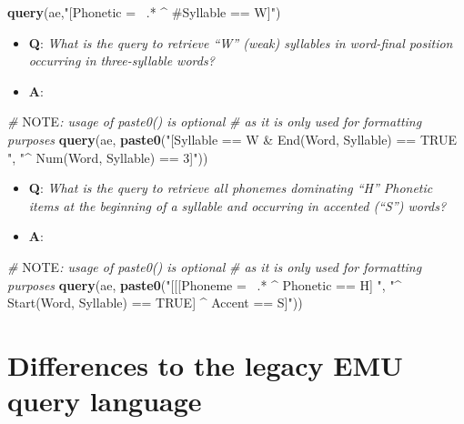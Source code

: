 \documentclass[]{book}
\newenvironment{Shaded}{\begin{snugshade}}{\end{snugshade}}
\newcommand{\AlertTok}[1]{\textcolor[rgb]{0.94,0.16,0.16}{#1}}
\newcommand{\CommentTok}[1]{\textcolor[rgb]{0.56,0.35,0.01}{\textit{#1}}}
\newcommand{\KeywordTok}[1]{\textcolor[rgb]{0.13,0.29,0.53}{\textbf{#1}}}
\newcommand{\NormalTok}[1]{#1}
\newcommand{\StringTok}[1]{\textcolor[rgb]{0.31,0.60,0.02}{#1}}
\providecommand{\tightlist}{%
  \setlength{\itemsep}{0pt}\setlength{\parskip}{0pt}}
\begin{document}
\begin{Shaded}
\begin{Highlighting}[]
\KeywordTok{query}\NormalTok{(ae,}\StringTok{"[Phonetic =~ .* ^ #Syllable == W]"}\NormalTok{)}
\end{Highlighting}
\end{Shaded}

\begin{itemize}
\tightlist
\item
  \textbf{Q}: \emph{What is the query to retrieve ``W'' (weak) syllables in word-final position occurring in three-syllable words?}
\item
  \textbf{A}:
\end{itemize}

\begin{Shaded}
\begin{Highlighting}[]
\CommentTok{# }\AlertTok{NOTE}\CommentTok{: usage of paste0() is optional}
\CommentTok{# as it is only used for formatting purposes}
\KeywordTok{query}\NormalTok{(ae, }\KeywordTok{paste0}\NormalTok{(}\StringTok{"[Syllable == W & End(Word, Syllable) == TRUE "}\NormalTok{,}
                 \StringTok{"^ Num(Word, Syllable) == 3]"}\NormalTok{))}
\end{Highlighting}
\end{Shaded}

\begin{itemize}
\tightlist
\item
  \textbf{Q}: \emph{What is the query to retrieve all phonemes dominating ``H'' Phonetic items at the beginning of a syllable and occurring in accented (``S'') words?}
\item
  \textbf{A}:
\end{itemize}

\begin{Shaded}
\begin{Highlighting}[]
\CommentTok{# }\AlertTok{NOTE}\CommentTok{: usage of paste0() is optional}
\CommentTok{# as it is only used for formatting purposes}
\KeywordTok{query}\NormalTok{(ae, }\KeywordTok{paste0}\NormalTok{(}\StringTok{"[[[Phoneme =~ .* ^ Phonetic == H] "}\NormalTok{,}
                 \StringTok{"^ Start(Word, Syllable) == TRUE] ^ Accent == S]"}\NormalTok{))}
\end{Highlighting}
\end{Shaded}

\hypertarget{differences-to-the-legacy-emu-query-language}{%
\section{Differences to the legacy EMU query language}\label{differences-to-the-legacy-emu-query-language}}
\end{document}
